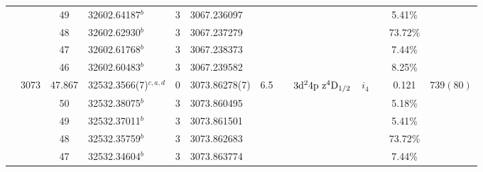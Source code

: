 \begin{table*}
\begin{center}
{\begin{tabular}{:l;l;c;l;c;l;c;l;l;c;c;c;c}
\rowstyle{\itshape}               &        & 49        & 32602.64187$^{b}$                & 3 &   3067.236097      &      & $                                        $ & $                                        $ & $      $ &              & 5.41\%    & $          $\\
\rowstyle{\itshape}               &        & 48        & 32602.62930$^{b}$                & 3 &   3067.237279      &      & $                                        $ & $                                        $ & $      $ &              & 73.72\%   & $          $\\
\rowstyle{\itshape}               &        & 47        & 32602.61768$^{b}$                & 3 &   3067.238373      &      & $                                        $ & $                                        $ & $      $ &              & 7.44\%    & $          $\\
\rowstyle{\itshape}               &        & 46        & 32602.60483$^{b}$                & 3 &   3067.239582      &      & $                                        $ & $                                        $ & $      $ &              & 8.25\%    & $          $\\
                                  & 3073   & 47.867    & 32532.3566(7)$^{c,a,d}$          & 0 &    3073.86278(7)   &  6.5 & $                                        $ & $3\rm{d}^24\rm{p~z}^4\rm{D}_{1/2}        $ & $i_{4} $ &              & 0.121     & $  739(80) $\\
\rowstyle{\itshape}               &        & 50        & 32532.38075$^{b}$                & 3 &   3073.860495      &      & $                                        $ & $                                        $ & $      $ &              & 5.18\%    & $          $\\
\rowstyle{\itshape}               &        & 49        & 32532.37011$^{b}$                & 3 &   3073.861501      &      & $                                        $ & $                                        $ & $      $ &              & 5.41\%    & $          $\\
\rowstyle{\itshape}               &        & 48        & 32532.35759$^{b}$                & 3 &   3073.862683      &      & $                                        $ & $                                        $ & $      $ &              & 73.72\%   & $          $\\
\rowstyle{\itshape}               &        & 47        & 32532.34604$^{b}$                & 3 &   3073.863774      &      & $                                        $ & $                                        $ & $      $ &              & 7.44\%    & $          $\\

\end{tabular}}
\end{center}
\end{table*}
